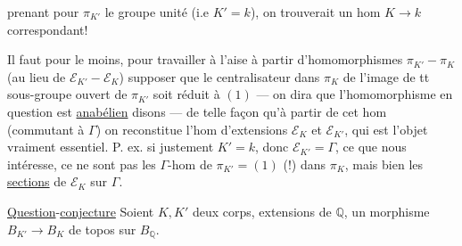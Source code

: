 prenant pour $\pi_{K'}$ le groupe unité (i.e $K'=k$), on trouverait un hom $K\longrightarrow k$ correspondant!

Il faut pour le moins, pour travailler à l'aise à partir d'homomorphismes $\pi_{K'}-\pi_K$ (au lieu de $\mathcal E_{K'}-\mathcal E_K$) supposer que le centralisateur dans $\pi_K$ de l'image de tt sous-groupe ouvert de $\pi_{K'}$ soit réduit à $(1)$ --- on dira que l'homomorphisme en question est \uline{anabélien} disons --- de telle façon qu'à partir de cet hom (commutant à $\Gamma$) on reconstitue l'hom d'extensions $\mathcal E_K$ et $\mathcal E_{K'}$, qui est l'objet vraiment essentiel. P. ex. si justement $K'=k$, donc $\mathcal E_{K'}=\Gamma$, ce que nous intéresse, ce ne sont pas les $\Gamma$-hom de $\pi_{K'}=(1)$ (!) dans $\pi_K$, mais bien les \uline{sections} de $\mathcal E_K$ sur $\Gamma$.

\uline{Question}-\uline{conjecture} Soient $K,K'$ deux corps, extensions   de $\mathbb Q$,   un morphisme $B_{K'}\longrightarrow B_K$ de topos sur $B_{\mathbb Q}$.
